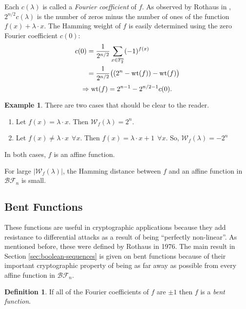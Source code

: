\documentclass[english]{article}
\def\gftwo{\mathbb{F}_2}
\def\BF{\mathcal{BF}}
\theoremstyle{plain}
\theoremstyle{definition}
\newtheorem{definition}[theorem]{Definition}%
\newtheorem{example}[theorem]{Example}
\theoremstyle{remark}
\begin{document}
\par Each $c(\lambda)$ is called a \textit{Fourier coefficient} of $f$.
As observed by Rothaus in \cite{art:r76}, $2^{n/2}c(\lambda)$ is the
number of zeros minus the number of ones of the function
$f(x)+\lambda\cdot x$. The Hamming weight of $f$ is easily determined using
the zero Fourier coefficient $c(0)$:
\begin{align*}
  c(0)&=\frac{1}{2^{n/2}}\sum_{x\in\gftwo^n}(-1)^{f(x)}\\
  &=\frac{1}{2^{n/2}}\big((2^n-{\rm wt}(f))-{\rm wt}(f)\big)
\end{align*}
\begin{equation}
  \Rightarrow {\rm wt}(f)=2^{n-1}-2^{n/2-1}c(0).
\end{equation}

\begin{example}
  There are two cases that should be clear to the reader.
  \begin{enumerate}[1.]
    \item Let $f(x)=\lambda\cdot x$. Then $\mathcal{W}_f(\lambda)=2^n$.
    \item Let $f(x)\not=\lambda\cdot x \ \ \forall x$. Then $f(x)=
      \lambda\cdot x+1 \ \ \forall x$. So, $\mathcal{W}_f(\lambda)=-2^n$
  \end{enumerate}
  In both cases, $f$ is an affine function.
\end{example}

\par For large $|\mathcal{W}_f(\lambda)|$, the Hamming distance between $f$ and
an affine function in $\BF_n$ is small.

\subsection{Bent Functions}
\par These functions are useful in cryptographic applications because they
add resistance to differential attacks as a result of being ``perfectly
non-linear''. As mentioned before, these were defined by Rothaus in 1976. The main
result in Section \ref{sec:boolean-sequences} is given on bent functions because
of their important cryptographic property of being as far away as possible from
every affine function in $\BF_n$.

\begin{definition}
  If all of the Fourier coefficients of $\hat{f}$ are $\pm1$ then
  $f$ is a \textit{bent function}.
\end{definition}
\end{document}
